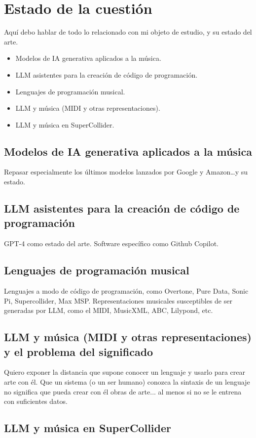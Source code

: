 \chapter{Estado de la cuestión}

Aquí debo hablar de todo lo relacionado con mi objeto de estudio, y su estado del arte.


\begin{itemize}
    \item Modelos de IA generativa aplicados a la música.
    \item LLM asistentes para la creación de código de programación.
    \item Lenguajes de programación musical.
    \item LLM y música (MIDI y otras representaciones).
    \item LLM y música en SuperCollider.
\end{itemize}

\section{Modelos de IA generativa aplicados a la música}
    Repasar especialmente los últimos modelos lanzados por Google y Amazon\dots y su estado.

\section{LLM asistentes para la creación de código de programación}
    GPT-4 como estado del arte. Software específico como Github Copilot.

\section{Lenguajes de programación musical}
    Lenguajes a modo de código de programación, como Overtone, Pure Data, Sonic Pi, Supercollider, Max MSP. Representaciones musicales susceptibles de ser generadas por LLM, como el MIDI, MusicXML, ABC, Lilypond, etc.

\section{LLM y música (MIDI y otras representaciones) y el problema del significado}
    Quiero exponer la distancia que supone conocer un lenguaje y usarlo para crear arte con él. Que un sistema (o un ser humano) conozca la sintaxis de un lenguaje no significa que pueda crear con él obras de arte... al menos si no se le entrena con suficientes datos.

\section{LLM y música en SuperCollider}
